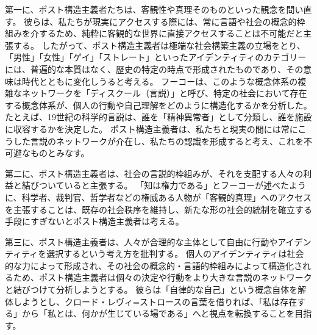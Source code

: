 \documentclass[paper=a4,book,openany]{jlreq}
\begin{document}
第一に、ポスト構造主義者たちは、客観性や真理そのものといった観念を問い直す。
彼らは、私たちが現実にアクセスする際には、常に言語や社会の概念的枠組みを介するため、純粋に客観的な世界に直接アクセスすることは不可能だと主張する。
したがって、ポスト構造主義者は極端な社会構築主義の立場をとり、「男性」「女性」「ゲイ」「ストレート」といったアイデンティティのカテゴリーには、普遍的な本質はなく、歴史の特定の時点で形成されたものであり、その意味は時代とともに変化しうると考える。
フーコーは、このような概念体系の複雑なネットワークを「ディスクール（言説）」と呼び、特定の社会において存在する概念体系が、個人の行動や自己理解をどのように構造化するかを分析した。
たとえば、19世紀の科学的言説は、誰を「精神異常者」として分類し、誰を施設に収容するかを決定した。
ポスト構造主義者は、私たちと現実の間には常にこうした言説のネットワークが介在し、私たちの認識を形成すると考え、これを不可避なものとみなす。

第二に、ポスト構造主義者は、社会の言説的枠組みが、それを支配する人々の利益と結びついていると主張する。
「知は権力である」とフーコーが述べたように、科学者、裁判官、哲学者などの権威ある人物が「客観的真理」へのアクセスを主張することは、既存の社会秩序を維持し、新たな形の社会的統制を確立する手段にすぎないとポスト構造主義者は考える。

第三に、ポスト構造主義者は、人々が合理的な主体として自由に行動やアイデンティティを選択するという考え方を批判する。
個人のアイデンティティは社会的な力によって形成され、その社会の概念的・言語的枠組みによって構造化されるため、ポスト構造主義者は個々の決定や行動をより大きな言説のネットワークと結びつけて分析しようとする。
彼らは「自律的な自己」という概念自体を解体しようとし、クロード・レヴィ=ストロースの言葉を借りれば、「私は存在する」から「私とは、何かが生じている場である」へと視点を転換することを目指す。
\end{document}
